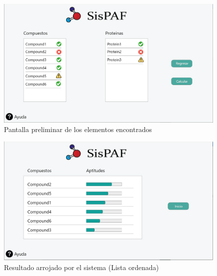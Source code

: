 \begin{figure}[H]
    \centering
    \includegraphics[scale=0.4]{Capitulo2/images/UI/5_preeliminar.PNG}
    \caption{Pantalla preliminar de los elementos encontrados}
    \label{preliminar}
\end{figure}
\begin{figure}[H]
    \centering
    \includegraphics[scale=0.4]{Capitulo2/images/UI/7_resultados.PNG}
    \caption{Resultado arrojado por el sistema (Lista ordenada)}
    \label{Resultados}
\end{figure}
